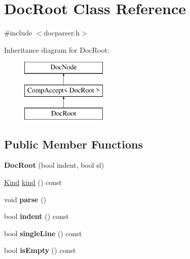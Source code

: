 \hypertarget{class_doc_root}{}\section{Doc\+Root Class Reference}
\label{class_doc_root}


{\ttfamily \#include $<$docparser.\+h$>$}

Inheritance diagram for Doc\+Root\+:\begin{figure}[H]
\begin{center}
\leavevmode
\includegraphics[height=3.000000cm]{class_doc_root}
\end{center}
\end{figure}
\subsection*{Public Member Functions}
\begin{DoxyCompactItemize}
\item 
\mbox{\label{class_doc_root_ae1a133da5f3562011cfe90cfa145219f}} 
{\bfseries Doc\+Root} (bool indent, bool sl)
\item 
\mbox{\hyperlink{class_doc_node_aebd16e89ca590d84cbd40543ea5faadb}{Kind}} \mbox{\hyperlink{class_doc_root_a10f6bf255986dbedb03f413827174276}{kind}} () const
\item 
\mbox{\label{class_doc_root_a860207dd6bee34648ddbfd55e3ddaff8}} 
void {\bfseries parse} ()
\item 
\mbox{\label{class_doc_root_a65e7fbdda6784c769c6333adc1fe629c}} 
bool {\bfseries indent} () const
\item 
\mbox{\label{class_doc_root_a32e7c733315cae51633409dfaaf6020f}} 
bool {\bfseries single\+Line} () const
\item 
\mbox{\label{class_doc_root_ade1a2bc91120fb42b66313298b37199d}} 
bool {\bfseries is\+Empty} () const
\end{DoxyCompactItemize}
